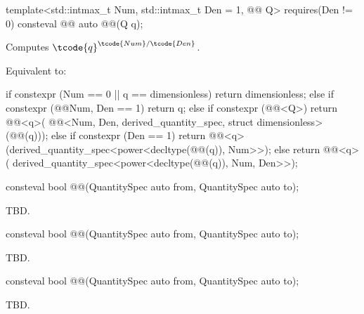 \begin{itemdecl}
template<std::intmax_t Num, std::intmax_t Den = 1, @@ Q>
  requires(Den != 0)
consteval @@ auto @@(Q q);
\end{itemdecl}

\begin{itemdescr}
\pnum
Computes $\tcode{q}^{\tcode{Num}/\tcode{Den}}$.

\pnum
\effects
Equivalent to:
\begin{codeblock}
if constexpr (Num == 0 || q == dimensionless)
  return dimensionless;
else if constexpr (@@{Num, Den} == 1)
  return q;
else if constexpr (@@<Q>)
  return @@<q>(
    @@<Num, Den, derived_quantity_spec, struct dimensionless>(@@(q)));
else if constexpr (Den == 1)
  return @@<q>(derived_quantity_spec<power<decltype(@@(q)), Num>>{});
else
  return @@<q>(
    derived_quantity_spec<power<decltype(@@(q)), Num, Den>>{});
\end{codeblock}
\end{itemdescr}

\begin{itemdecl}
consteval bool @@(QuantitySpec auto from, QuantitySpec auto to);
\end{itemdecl}

\begin{itemdescr}
\pnum
\returns
TBD.
\end{itemdescr}

\begin{itemdecl}
consteval bool @@(QuantitySpec auto from, QuantitySpec auto to);
\end{itemdecl}

\begin{itemdescr}
\pnum
\returns
TBD.
\end{itemdescr}

\begin{itemdecl}
consteval bool @@(QuantitySpec auto from, QuantitySpec auto to);
\end{itemdecl}

\begin{itemdescr}
\pnum
\returns
TBD.
\end{itemdescr}

